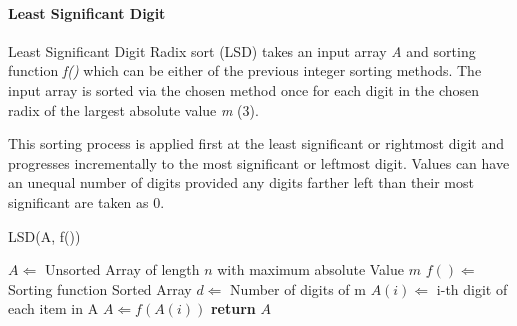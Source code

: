 \documentclass[12pt]{article}
\begin{document}
	\paragraph{Least Significant Digit}
	\label{ssec:lsd}
	Least Significant Digit Radix sort (LSD) takes an input array \textit{A} and sorting function \textit{f()} which can be either of the previous integer sorting methods. The input array is sorted via the chosen method once for each digit in the chosen radix of the largest absolute value \textit{m} (3).
	\par 
	This sorting process is applied first at the least significant or rightmost digit and progresses incrementally to the most significant or leftmost digit. Values can have an unequal number of digits provided any digits farther left than their most significant are taken as 0.
	
	\begin{algorithm} %
		\caption{LSD({A, f()})} %
		\label{alg3} %
		\begin{algorithmic}[1] %
			\REQUIRE $A \Leftarrow$ Unsorted Array of length $n$ with maximum absolute Value $m$
			\REQUIRE $f() \Leftarrow $Sorting function 
			\ENSURE Sorted Array
			\STATE $d \Leftarrow$ Number of digits of m 
			\STATE $A(i) \Leftarrow$ i-th digit of each item in A
				\STATE $A \Leftarrow f(A(i))$ 
			\ENDFOR
			\STATE \textbf{return} $A$
		\end{algorithmic}
	\end{algorithm}
	\pagebreak
\end{document}
